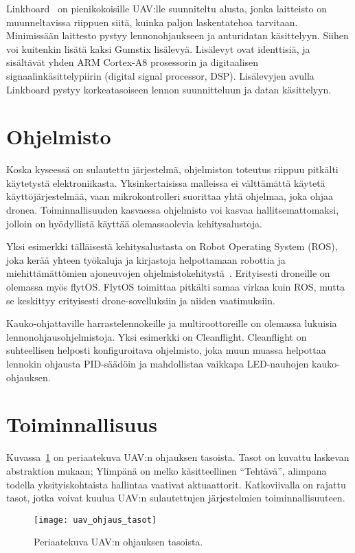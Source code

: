 Linkboard~\cite{Wzorek2017} on pienikokoisille UAV:lle suunniteltu alusta,
jonka laitteisto on muunneltavissa riippuen siitä, kuinka paljon laskentatehoa
tarvitaan. Minimissään laittesto pystyy lennonohjaukseen ja anturidatan
käsittelyyn. Siihen voi kuitenkin lisätä kaksi Gumstix lisälevyä. Lisälevyt
ovat identtisiä, ja sisältävät yhden ARM Cortex-A8 prosessorin ja digitaalisen
signaalinkäsittelypiirin (digital signal processor, DSP). Lisälevyjen avulla
Linkboard pystyy korkeatasoiseen lennon suunnitteluun ja datan käsittelyyn.

\section{Ohjelmisto}
Koska kyseessä on sulautettu järjestelmä, ohjelmiston toteutus riippuu pitkälti
käytetystä elektroniikasta. Yksinkertaisissa malleissa ei välttämättä käytetä
käyttöjärjestelmää, vaan mikrokontrolleri suorittaa yhtä ohjelmaa, joka ohjaa
dronea. Toiminnallisuuden kasvaessa ohjelmisto voi kasvaa hallitsemattomaksi,
jolloin on hyödyllistä käyttää olemassaolevia kehitysalustoja.

Yksi esimerkki tälläisestä kehitysalustasta on Robot Operating System (ROS),
joka kerää yhteen työkaluja ja kirjastoja helpottamaan robottia ja
miehittämättömien ajoneuvojen ohjelmistokehitystä~\cite{RobotOperatingSystem}.
Erityisesti droneille on olemassa myös flyt\@{OS}. Flyt\@{OS} toimittaa
pitkälti samaa virkaa kuin ROS, mutta se keskittyy erityisesti
drone-sovelluksiin ja niiden vaatimuksiin.~\cite{flytOS}

Kauko-ohjattaville harrastelennokeille ja multiroottoreille on olemassa
lukuisia lennonohjausohjelmistoja. Yksi esimerkki on Cleanflight. Cleanflight
on suhteellisen helposti konfiguroitava ohjelmisto, joka muun muassa helpottaa
lennokin ohjausta PID-säädöin ja mahdollistaa vaikkapa LED-nauhojen
kauko-ohjauksen.~\cite{Cleanflight}


\section{Toiminnallisuus}

Kuvassa~\ref{fig:uav_ohjaus_tasot} on periaatekuva UAV:n ohjauksen tasoista.
Tasot on kuvattu laskevan abstraktion mukaan; Ylimpänä on melko käsitteellinen
``Tehtävä'', alimpana todella yksityiskohtaista hallintaa vaativat
aktuaattorit. Katkoviivalla on rajattu tasot, jotka voivat kuulua UAV:n
sulautettujen järjestelmien toiminnallisuuteen.
\begin{figure}[H]
  \begin{center}
    \texttt{[image: uav\_ohjaus\_tasot]}
  \end{center}
  \caption{Periaatekuva UAV:n ohjauksen tasoista.}
\label{fig:uav_ohjaus_tasot}
\end{figure}


